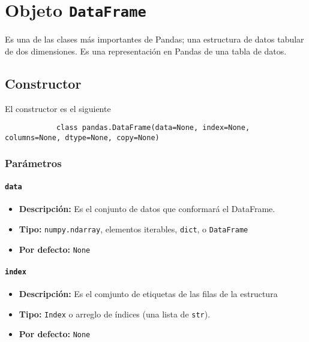     \section{Objeto \texttt{DataFrame}}

        Es una de las clases más importantes de Pandas; una estructura de datos tabular de dos dimensiones. Es una representación en Pandas de una tabla de datos.

        \subsection{Constructor} El constructor es el siguiente

        \begin{verbatim}
            class pandas.DataFrame(data=None, index=None, columns=None, dtype=None, copy=None)
        \end{verbatim}
        \subsubsection{Parámetros}

        \paragraph{\texttt{data}}
        \begin{itemize}
            \item \textbf{Descripción:} Es el conjunto de datos que conformará el DataFrame.
            \item \textbf{Tipo:} \texttt{numpy.ndarray}, elementos iterables, \texttt{dict}, o \texttt{DataFrame}
            \item \textbf{Por defecto:} \texttt{None}
        \end{itemize}

        \paragraph{\texttt{index}}
        \begin{itemize}
            \item \textbf{Descripción:} Es el comjunto de etiquetas de las filas de la estructura
            \item     \textbf{Tipo:} \texttt{Index} o arreglo de índices (una lista de \texttt{str}).
            \item     \textbf{Por defecto:} \texttt{None}
        \end{itemize}

